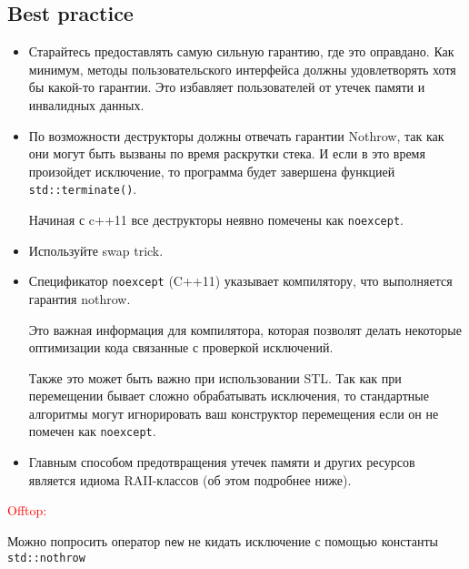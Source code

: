 \subsection{Best practice}
\begin{itemize}

\item
Старайтесь предоставлять самую сильную гарантию, где это оправдано.
Как минимум, методы пользовательского интерфейса должны удовлетворять хотя бы какой-то гарантии. Это избавляет пользователей от утечек памяти и инвалидных данных.

\item
 По возможности деструкторы должны отвечать гарантии Nothrow, так как они могут быть вызваны по время раскрутки стека. И если в это время произойдет исключение, то программа будет завершена функцией \texttt{std::terminate()}.

 Начиная с c++11 все деструкторы неявно помечены как \texttt{noexcept}.

\item Используйте swap trick.

\item Спецификатор \texttt{noexcept} (C++11) указывает компилятору, что выполняется гарантия nothrow.

Это важная информация для компилятора, которая позволят делать некоторые оптимизации кода связанные с проверкой исключений.

Также это может быть важно при использовании STL. Так как при перемещении бывает сложно обрабатывать исключения, то стандартные алгоритмы могут игнорировать ваш конструктор перемещения если он не помечен как \texttt{noexcept}.

\item
Главным способом предотвращения утечек памяти и других ресурсов является идиома RAII-классов (об этом подробнее ниже).

\end{itemize}
\textcolor{red}{Offtop:}

Можно попросить оператор \texttt{new} не кидать исключение с помощью константы \texttt{std::nothrow}

